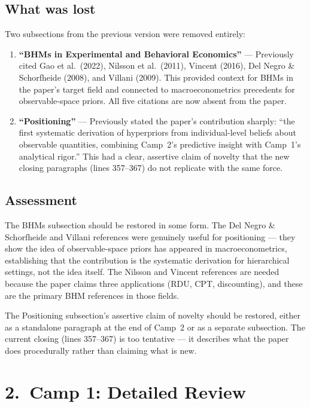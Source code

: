 \documentclass[12pt,a4paper]{article}
\begin{document}
\subsection{What was lost}

Two subsections from the previous version were removed entirely:

\begin{enumerate}[leftmargin=1.5em]
  \item \textbf{``BHMs in Experimental and Behavioral Economics''} ---
    Previously cited Gao et al.\ (2022), Nilsson et al.\ (2011), Vincent
    (2016), Del Negro \& Schorfheide (2008), and Villani (2009). This
    provided context for BHMs in the paper's target field and connected to
    macroeconometrics precedents for observable-space priors. All five
    citations are now absent from the paper.
  \item \textbf{``Positioning''} --- Previously stated the paper's
    contribution sharply: ``the first systematic derivation of hyperpriors from
    individual-level beliefs about observable quantities, combining Camp~2's
    predictive insight with Camp~1's analytical rigor.'' This had a clear,
    assertive claim of novelty that the new closing paragraphs (lines
    357--367) do not replicate with the same force.
\end{enumerate}

\subsection{Assessment}

The BHMs subsection should be restored in some form. The Del Negro \&
Schorfheide and Villani references were genuinely useful for positioning ---
they show the idea of observable-space priors has appeared in
macroeconometrics, establishing that the contribution is the systematic
derivation for hierarchical settings, not the idea itself. The Nilsson and
Vincent references are needed because the paper claims three applications
(RDU, CPT, discounting), and these are the primary BHM references in those
fields.

The Positioning subsection's assertive claim of novelty should be
restored, either as a standalone paragraph at the end of Camp~2 or as a
separate subsection. The current closing (lines 357--367) is too tentative ---
it describes what the paper does procedurally rather than claiming what is new.


\section{2.\ Camp 1: Detailed Review}
\end{document}
